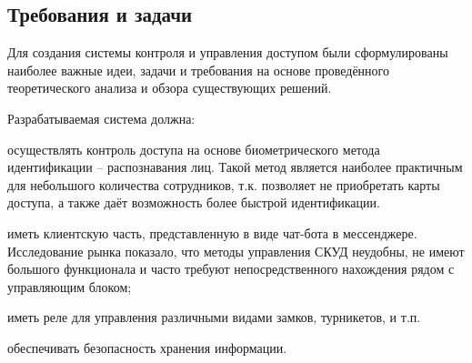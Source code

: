 \subsection{Требования и задачи}

Для создания системы контроля и управления доступом были сформулированы наиболее важные идеи, задачи и требования на основе проведённого теоретического анализа и обзора существующих решений.

Разрабатываемая система должна:

\begin{itemize*}
\item осуществлять контроль доступа на основе биометрического метода идентификации -- распознавания лиц. Такой метод является наиболее практичным для небольшого количества сотрудников, т.к. позволяет не приобретать карты доступа, а также даёт возможность более быстрой идентификации.
\item иметь клиентскую часть, представленную в виде чат-бота в мессенджере. Исследование рынка показало, что методы управления СКУД неудобны, не имеют большого функционала и часто требуют непосредственного нахождения рядом с управляющим блоком;
\item иметь реле для управления различными видами замков, турникетов, и т.п.
\item обеспечивать безопасность хранения информации.
\end{itemize*}
